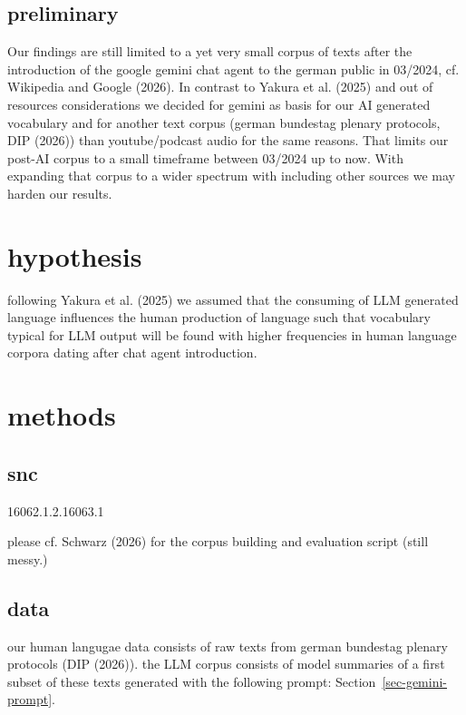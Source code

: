 \documentclass[
  letterpaper,
  DIV=11,
  numbers=noendperiod]{scrartcl}
\begin{document}
\subsection{preliminary}\label{preliminary}

Our findings are still limited to a yet very small corpus of texts after
the introduction of the google gemini chat agent to the german public in
03/2024, cf. Wikipedia and Google (2026). In contrast to Yakura et al.
(2025) and out of resources considerations we decided for gemini as
basis for our AI generated vocabulary and for another text corpus
(german bundestag plenary protocols, DIP (2026)) than youtube/podcast
audio for the same reasons. That limits our post-AI corpus to a small
timeframe between 03/2024 up to now. With expanding that corpus to a
wider spectrum with including other sources we may harden our results.

\section{hypothesis}\label{hypothesis}

following Yakura et al. (2025) we assumed that the consuming of LLM
generated language influences the human production of language such that
vocabulary typical for LLM output will be found with higher frequencies
in human language corpora dating after chat agent introduction.

\section{methods}\label{methods}

\subsection{snc}\label{snc-1}

16062.1.2.16063.1

please cf. Schwarz (2026) for the corpus building and evaluation script
(still messy.)

\subsection{data}\label{data}

our human langugae data consists of raw texts from german bundestag
plenary protocols (DIP (2026)). the LLM corpus consists of model
summaries of a first subset of these texts generated with the following
prompt: Section~\ref{sec-gemini-prompt}.
\end{document}
